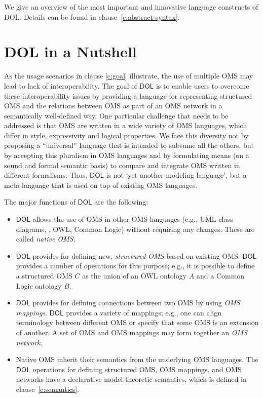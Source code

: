 \documentclass[10pt,fleqn,%
\ifpretendfinal
final%
\else
draft%
\fi,
]{scrreprt}
\makeatletter
\newcommand*\CommentAuthor{}
\renewcommand*\CommentAuthor{#1}}
\newcommand*\CommentDate{}
\renewcommand*\CommentDate{#1}}
\newcommand*\CommentId{}
\renewcommand*\CommentId{#1}}
\newcommand*\CommentType{}
\renewcommand*\CommentType{#1}}
\newcommand*{\SetCommentColorByType}[1]{%
\edef\localType{{#1}}%
\expandafter\ifstrequal\localType{q-aut}{\colorlet{CommentColor}{red}}{%
\expandafter\ifstrequal\localType{q-all}{\colorlet{CommentColor}{orange}}{%
\expandafter\ifstrequal\localType{todo}{\colorlet{CommentColor}{orange}}{%
\expandafter\ifstrequal\localType{fyi}{\colorlet{CommentColor}{lightgray}}{%
\colorlet{CommentColor}{yellow}}}}}}
\newcommand*{\SetCommentPrefixByType}[1]{%
\edef\localType{{#1}}%
\expandafter\@ifmtarg\localType{%
\edef\CommentPrefix{}%
}{%
\caseupper[q]{#1}%
\edef\CommentPrefix{\thestring: }%
}}
\newcommand*{\initComment}[1]{%
\setkeys{Comment}{#1}%
\SetCommentColorByType{\CommentType}%
\relax%
\SetCommentPrefixByType{\CommentType}%
\relax%
}
\newcommand*{\todonote}[2][]{%
\initComment{#1}%
\pdfcomment[author=\CommentAuthor,color=CommentColor,date=\CommentDate,id=\CommentId]{%
\CommentPrefix
#2}}
\renewcommand*{\todonote}[2][]{%
\initComment{#1}%
\ednote{\CommentPrefix #2}}
\newcommand*{\DOL}{\ensuremath{\mathsf{DOL}}\xspace}
\newcommand{\clauserefname}{clause}
\newcommand{\cref}[1]{\clauserefname~\ref{#1}}
\makeatother
\begin{document}
%
%
\label{c:design:overview}
%

We give an overview of the most important and innovative language
constructs of DOL. Details can be found in clause~\ref{c:abstract-syntax}.

\section{DOL in a Nutshell}

As the usage scenarios in clause \ref{c:goal} illustrate, the use of multiple OMS may lead to lack 
 of interoperability. The goal of \DOL is to enable users to overcome these interoperability issues by providing a language for representing 
structured OMS and the relations between OMS as part of an OMS network in a semantically well-defined way. One particular challenge that needs to be
addressed is that OMS are written in a wide variety of OMS languages, which differ in style, 
expressivity and logical properties. 
We face this diversity not by proposing a
``universal'' language that is intended to subsume all the others, but by accepting
this pluralism in OMS languages and by formulating means (on a sound and formal semantic basis) to
 compare and integrate OMS written in different formalisms. Thus, \DOL is not `yet-another-modeling
language', but a meta-language that is used on top of existing OMS languages. 

The major functions of \DOL are the following: 
\begin{itemize}
		\item \DOL allows the use of OMS in other OMS languages (e.g., UML class diagrams, \CASL, 
		OWL, Common Logic) without requiring any changes. These are called \emph{native OMS}.  
		\item \DOL provides for defining new, \emph{structured OMS} based on existing OMS.  \DOL provides a number of operations for this purpose; e.g.,
		it is possible to define a structured OMS $C$ as the union of an OWL
		ontology $A$ and a Common Logic ontology $B$.
		\item \DOL provides for defining connections between two OMS by using 
		\emph{OMS mappings}. \DOL provides a variety of mappings; e.g.,  one can align terminology 
		between different OMS or specify that some OMS is an extension of another. A set of OMS
		and OMS mappings may form together an \emph{OMS network}.
		\item Native OMS inherit their semantics from the underlying OMS languages. The \DOL
		 operations for defining structured OMS, 
		OMS mappings, and OMS networks have a declarative model-theoretic semantics, which is 
		 defined in \cref{c:semantics}.  
\end{itemize}
 
\end{document}
